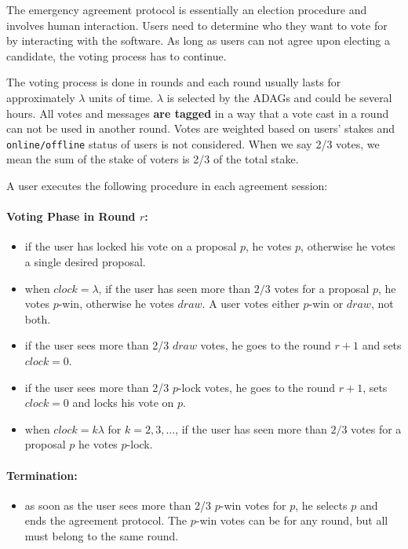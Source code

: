 The emergency agreement protocol is essentially an election procedure and involves human interaction. Users need to
determine who they want to vote for by interacting with the software. As long as users can not agree upon electing a
candidate, the voting process has to continue.

The voting process is done in rounds and each round usually lasts for approximately $\lambda$ units of time.
$\lambda$ is selected by the ADAGs and could be several hours. All votes and messages \textbf{are tagged} in a way
that a vote cast in a round can not be used in another round. Votes are weighted based on users' stakes and
\texttt{online/offline} status of users is not considered. When we say 2/3 votes, we mean the sum of the stake of
voters is 2/3 of the total stake.

A user executes the following procedure in each agreement session:
\paragraph{Voting Phase in Round $r$:}
\begin{itemize}
    \item if the user has locked his vote on a proposal $p$, he votes $p$, otherwise he votes a single desired
    proposal.
    \item when $clock = \lambda$, if the user has seen more than $2/3$ votes for a proposal $p$, he votes $p$-win,
    otherwise he votes $draw$. A user votes either $p$-win or $draw$, not both.
    \item if the user sees more than 2/3 $draw$ votes, he goes to the round $r+1$ and sets $clock=0$.
    \item if the user sees more than 2/3 $p$-lock votes, he goes to the round $r+1$, sets $clock=0$ and locks his
    vote on $p$.
    \item when $clock = k \lambda$ for $k=2,3,\dots$, if the user has seen more than $2/3$ votes for a proposal
    $p$ he votes $p$-lock.
\end{itemize}

\paragraph{Termination:}
\begin{itemize}
    \item as soon as the user sees more than 2/3 $p$-win votes for $p$, he selects $p$ and ends
    the agreement protocol. The $p$-win votes can be for any round, but all must belong to the same round.
\end{itemize}


